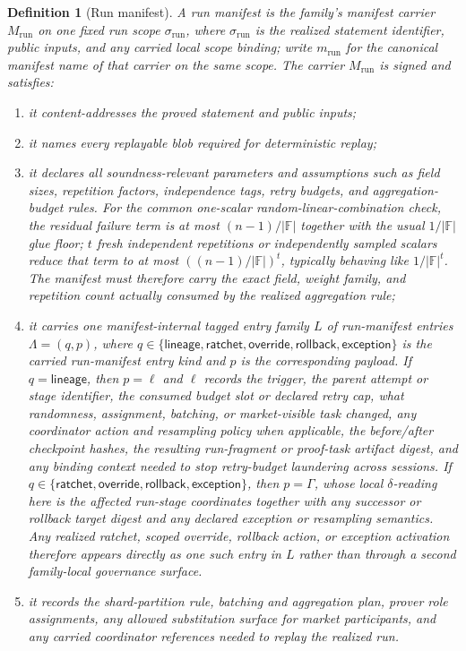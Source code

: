 \documentclass[11pt]{article}
\newtheorem{definition}{Definition}
\newcommand{\F}{\mathbb{F}}
\begin{document}
\begin{definition}[Run manifest]
A run manifest is the family's manifest carrier $M_{\mathrm{run}}$ on one fixed run scope $\sigma_{\mathrm{run}}$, where $\sigma_{\mathrm{run}}$ is the realized statement identifier, public inputs, and any carried local scope binding; write $m_{\mathrm{run}}$ for the canonical manifest name of that carrier on the same scope. The carrier $M_{\mathrm{run}}$ is signed and satisfies:
\begin{enumerate}[label=\textnormal{(\roman*)},leftmargin=2em]
\item it content-addresses the proved statement and public inputs;
\item it names every replayable blob required for deterministic replay;
\item it declares all soundness-relevant parameters and assumptions such as field sizes, repetition factors, independence tags, retry budgets, and aggregation-budget rules. For the common one-scalar random-linear-combination check, the residual failure term is at most $(n-1)/|\F|$ together with the usual $1/|\F|$ glue floor; $t$ fresh independent repetitions or independently sampled scalars reduce that term to at most $((n-1)/|\F|)^t$, typically behaving like $1/|\F|^t$. The manifest must therefore carry the exact field, weight family, and repetition count actually consumed by the realized aggregation rule;
\item it carries one manifest-internal tagged entry family $L$ of run-manifest entries $\Lambda=(q,p)$, where $q\in\{\mathsf{lineage},\mathsf{ratchet},\mathsf{override},\mathsf{rollback},\mathsf{exception}\}$ is the carried run-manifest entry kind and $p$ is the corresponding payload. If $q=\mathsf{lineage}$, then $p=\ell$ and $\ell$ records the trigger, the parent attempt or stage identifier, the consumed budget slot or declared retry cap, what randomness, assignment, batching, or market-visible task changed, any coordinator action and resampling policy when applicable, the before/after checkpoint hashes, the resulting run-fragment or proof-task artifact digest, and any binding context needed to stop retry-budget laundering across sessions. If $q\in\{\mathsf{ratchet},\mathsf{override},\mathsf{rollback},\mathsf{exception}\}$, then $p=\Gamma$, whose local $\delta$-reading here is the affected run-stage coordinates together with any successor or rollback target digest and any declared exception or resampling semantics. Any realized ratchet, scoped override, rollback action, or exception activation therefore appears directly as one such entry in $L$ rather than through a second family-local governance surface.
\item it records the shard-partition rule, batching and aggregation plan, prover role assignments, any allowed substitution surface for market participants, and any carried coordinator references needed to replay the realized run.
\end{enumerate}
\end{definition}
\end{document}
